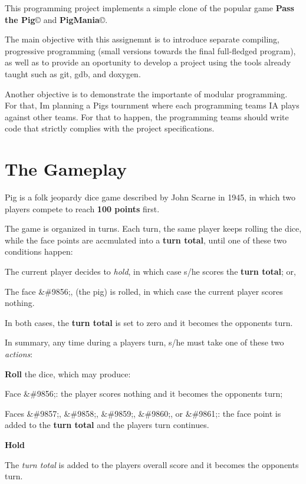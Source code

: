 This programming project implements a simple clone of the popular game {\bfseries Pass the Pig}\copyright{} and {\bfseries Pig\+Mania}\copyright{}.

The main objective with this assignemnt is to introduce separate compiling, progressive programming (small versions towards the final full-\/fledged program), as well as to provide an oportunity to develop a project using the tools already taught such as git, gdb, and doxygen.

Another objective is to demonstrate the importante of modular programming. For that, I\textquotesingle{}m planning a Pig\textquotesingle{}s tournment where each programming team\textquotesingle{}s IA plays against other teams. For that to happen, the programming teams should write code that strictly complies with the project specifications.

\section*{The Gameplay}

Pig is a folk jeopardy dice game described by John Scarne in 1945, in which two players compete to reach {\bfseries 100 points} first.

The game is organized in turns. Each turn, the same player keeps rolling the dice, while the face points are accmulated into a {\bfseries turn total}, until one of these two conditions happen\+:


\begin{DoxyEnumerate}
\item The current player decides to {\itshape hold}, in which case s/he scores the {\bfseries turn total}; or,
\item The face \&\#9856;, (the pig) is rolled, in which case the current player scores nothing.
\end{DoxyEnumerate}

In both cases, the {\bfseries turn total} is set to zero and it becomes the opponent\textquotesingle{}s turn.

In summary, any time during a player\textquotesingle{}s turn, s/he must take one of these two {\itshape actions}\+:


\begin{DoxyItemize}
\item {\bfseries Roll} the dice, which may produce\+:
\begin{DoxyItemize}
\item Face \&\#9856;\+: the player scores nothing and it becomes the opponent\textquotesingle{}s turn;
\item Faces \&\#9857;, \&\#9858;, \&\#9859;, \&\#9860;, or \&\#9861;\+: the face point is added to the {\bfseries turn total} and the player\textquotesingle{}s turn continues.
\end{DoxyItemize}
\item {\bfseries Hold}
\begin{DoxyItemize}
\item The {\itshape turn total} is added to the player\textquotesingle{}s overall score and it becomes the opponent\textquotesingle{}s turn.
\end{DoxyItemize}
\end{DoxyItemize}

